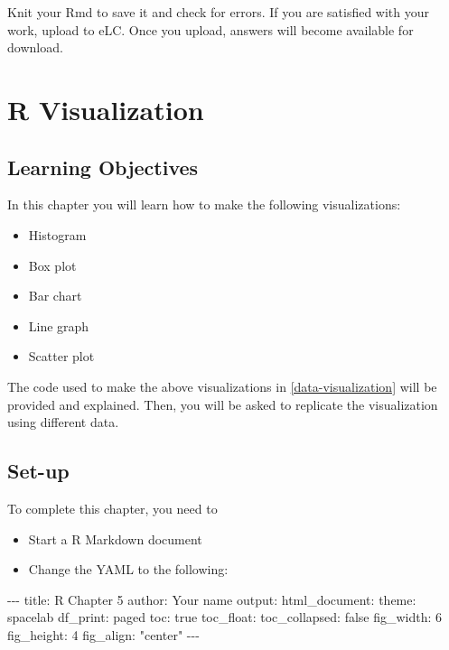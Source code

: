 \documentclass[
]{book}
\makeatletter
\newenvironment{Shaded}{\begin{snugshade}}{\end{snugshade}}
\newcommand{\DecValTok}[1]{\textcolor[rgb]{0.06,0.06,0.06}{#1}}
\newcommand{\NormalTok}[1]{#1}
\newcommand{\SpecialCharTok}[1]{\textcolor[rgb]{0,0,0}{#1}}
\newcommand{\StringTok}[1]{\textcolor[rgb]{0.5,0.5,0.5}{#1}}
\providecommand{\tightlist}{%
  \setlength{\itemsep}{0pt}\setlength{\parskip}{0pt}}
\newenvironment{kframe}{%
\medskip{}
\setlength{\fboxsep}{.8em}
 \def\at@end@of@kframe{}%
 \ifinner\ifhmode%
  \def\at@end@of@kframe{\end{minipage}}%
  \begin{minipage}{\columnwidth}%
 \fi\fi%
 \def\FrameCommand##1{\hskip\@totalleftmargin \hskip-\fboxsep
 \colorbox{shadecolor}{##1}\hskip-\fboxsep
     \hskip-\linewidth \hskip-\@totalleftmargin \hskip\columnwidth}%
 \MakeFramed {\advance\hsize-\width
   \@totalleftmargin\z@ \linewidth\hsize
   \@setminipage}}%
 {\par\unskip\endMakeFramed%
 \at@end@of@kframe}
\renewenvironment{Shaded}{\begin{kframe}}{\end{kframe}}
\makeatother
\begin{document}
Knit your Rmd to save it and check for errors. If you are satisfied with your work, upload to eLC. Once you upload, answers will become available for download.

\hypertarget{r-visualization}{%
\chapter{R Visualization}\label{r-visualization}}

\hypertarget{learning-objectives}{%
\section{Learning Objectives}\label{learning-objectives}}

In this chapter you will learn how to make the following visualizations:

\begin{itemize}
\tightlist
\item
  Histogram
\item
  Box plot
\item
  Bar chart
\item
  Line graph
\item
  Scatter plot
\end{itemize}

The code used to make the above visualizations in \ref{data-visualization} will be provided and explained. Then, you will be asked to replicate the visualization using different data.

\hypertarget{set-up}{%
\section{Set-up}\label{set-up}}

To complete this chapter, you need to

\begin{itemize}
\tightlist
\item
  Start a R Markdown document
\item
  Change the YAML to the following:
\end{itemize}

\begin{Shaded}
\begin{Highlighting}[]
\SpecialCharTok{{-}{-}{-}}
\NormalTok{title}\SpecialCharTok{:} \StringTok{\textquotesingle{}R Chapter 5\textquotesingle{}}
\NormalTok{author}\SpecialCharTok{:} \StringTok{\textquotesingle{}Your name\textquotesingle{}}
\NormalTok{output}\SpecialCharTok{:} 
\NormalTok{  html\_document}\SpecialCharTok{:}
\NormalTok{    theme}\SpecialCharTok{:}\NormalTok{ spacelab}
\NormalTok{    df\_print}\SpecialCharTok{:}\NormalTok{ paged}
\NormalTok{    toc}\SpecialCharTok{:}\NormalTok{ true}
\NormalTok{    toc\_float}\SpecialCharTok{:}
\NormalTok{      toc\_collapsed}\SpecialCharTok{:}\NormalTok{ false}
\NormalTok{    fig\_width}\SpecialCharTok{:} \DecValTok{6}
\NormalTok{    fig\_height}\SpecialCharTok{:} \DecValTok{4}
\NormalTok{    fig\_align}\SpecialCharTok{:} \StringTok{"center"}
\SpecialCharTok{{-}{-}{-}}
\end{Highlighting}
\end{Shaded}
\end{document}
